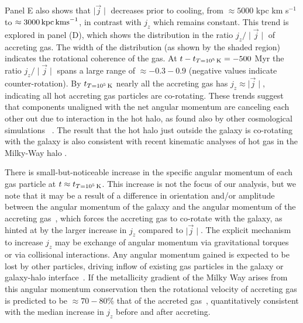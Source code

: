 \documentclass[fleqn,usenatbib]{mnras}
\newcommand{\tcon}{t_{T=10^5\,{\rm K}}}
\begin{document}
Panel E also shows that $\mid \vec j \mid$ decreases prior to cooling, from $\approx 5000$ kpc km s$^{-1}$ to $\approx 3000\,{\rm kpc\,km s}^{-1}$, in contrast with  $j_z$ which remains constant.
This trend is explored in  panel (D), which shows the distribution in the ratio $j_z/\mid\vec j\mid$ of accreting gas.
The width of the distribution (as shown by the shaded region) indicates the rotational coherence of the gas. 
At $t-\tcon=-500$ Myr the ratio $j_z/\mid\vec j\mid$ spans a large range of $\approx -0.3 - 0.9$ (negative values indicate counter-rotation).
By $\tcon$ nearly all the accreting gas has $j_z\approx\mid\vec j\mid$, indicating all hot accreting gas particles are co-rotating. 
These trends suggest that components unaligned with the net angular momentum are canceling each other out due to interaction in the hot halo, as found also by other cosmological simulations ~\citep[e.g.][]{DeFelippis2017}.
The result that the hot halo just outside the galaxy is co-rotating with the galaxy is also consistent with recent kinematic analyses of hot gas in the Milky-Way halo \citep{Miller2016}.

There is small-but-noticeable increase in the specific angular momentum of each gas particle at $t \approx \tcon$.
This increase is not the focus of our analysis, but we note that it may be a result of a difference in orientation and/or amplitude between the angular momentum of the galaxy and the angular momentum of the accreting gas~\citep[e.g.][]{Danovich2012, DeFelippis2017, DeFelippis2020}, which forces the accreting gas to co-rotate with the galaxy, as hinted at by the larger increase in $j_z$ compared to $\mid \vec j \mid$.
The explicit mechanism to increase $j_z$ may be exchange of angular momentum via gravitational torques~\citep[e.g.][]{Danovich2015} or via collisional interactions.
Any angular momentum gained is expected to be lost by other particles, driving inflow of existing gas particles in the galaxy or galaxy-halo interface~\citep[e.g.][]{Mayor1981, Pezzulli2017}.
If the metallicity gradient of the Milky Way arises from this angular momentum conservation then the rotational velocity of accreting gas is predicted to be $\approx 70-80\%$ that of the accreted gas~\citep{Pezzulli2016b}, quantitatively consistent with the median increase in $j_z$ before and after accreting.
\end{document}
